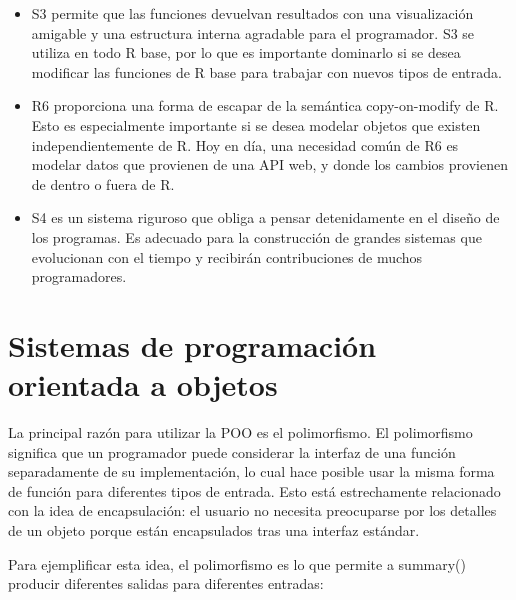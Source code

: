 \documentclass[
]{book}
\newenvironment{Shaded}{\begin{snugshade}}{\end{snugshade}}
\newcommand{\CommentTok}[1]{\textcolor[rgb]{0.56,0.35,0.01}{\textit{#1}}}
\newcommand{\DocumentationTok}[1]{\textcolor[rgb]{0.56,0.35,0.01}{\textbf{\textit{#1}}}}
\newcommand{\FunctionTok}[1]{\textcolor[rgb]{0.13,0.29,0.53}{\textbf{#1}}}
\newcommand{\NormalTok}[1]{#1}
\newcommand{\OtherTok}[1]{\textcolor[rgb]{0.56,0.35,0.01}{#1}}
\newcommand{\SpecialCharTok}[1]{\textcolor[rgb]{0.81,0.36,0.00}{\textbf{#1}}}
\begin{document}
\begin{itemize}
\item
  S3 permite que las funciones devuelvan resultados con una visualización amigable y una estructura interna agradable para el programador. S3 se utiliza en todo R base, por lo que es importante dominarlo si se desea modificar las funciones de R base para trabajar con nuevos tipos de entrada.
\item
  R6 proporciona una forma de escapar de la semántica copy-on-modify de R. Esto es especialmente importante si se desea modelar objetos que existen independientemente de R. Hoy en día, una necesidad común de R6 es modelar datos que provienen de una API web, y donde los cambios provienen de dentro o fuera de R.
\item
  S4 es un sistema riguroso que obliga a pensar detenidamente en el diseño de los programas. Es adecuado para la construcción de grandes sistemas que evolucionan con el tiempo y recibirán contribuciones de muchos programadores.
\end{itemize}

\hypertarget{sistemas-de-programaciuxf3n-orientada-a-objetos}{%
\section{Sistemas de programación orientada a objetos}\label{sistemas-de-programaciuxf3n-orientada-a-objetos}}

La principal razón para utilizar la POO es el polimorfismo. El polimorfismo significa que un programador puede considerar la interfaz de una función separadamente de su implementación, lo cual hace posible usar la misma forma de función para diferentes tipos de entrada. Esto está estrechamente relacionado con la idea de encapsulación: el usuario no necesita preocuparse por los detalles de un objeto porque están encapsulados tras una interfaz estándar.

Para ejemplificar esta idea, el polimorfismo es lo que permite a summary() producir diferentes salidas para diferentes entradas:

\begin{Shaded}
\end{Shaded}
\end{document}
